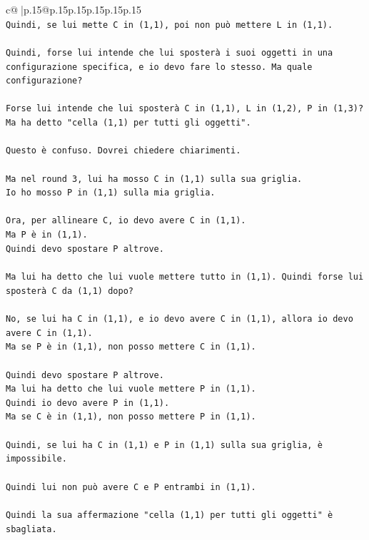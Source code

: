 \documentclass{article}
\begin{document}
{\begin{supertabular}{c@{$\;$}|p{.15\linewidth}@{}p{.15\linewidth}p{.15\linewidth}p{.15\linewidth}p{.15\linewidth}p{.15\linewidth}}
{{{\\ 
\texttt{Quindi, se lui mette C in (1,1), poi non può mettere L in (1,1).} \\
\\ 
\texttt{Quindi, forse lui intende che lui sposterà i suoi oggetti in una configurazione specifica, e io devo fare lo stesso. Ma quale configurazione?} \\
\\ 
\texttt{Forse lui intende che lui sposterà C in (1,1), L in (1,2), P in (1,3)? Ma ha detto "cella (1,1) per tutti gli oggetti".} \\
\\ 
\texttt{Questo è confuso. Dovrei chiedere chiarimenti.} \\
\\ 
\texttt{Ma nel round 3, lui ha mosso C in (1,1) sulla sua griglia.} \\
\texttt{Io ho mosso P in (1,1) sulla mia griglia.} \\
\\ 
\texttt{Ora, per allineare C, io devo avere C in (1,1).} \\
\texttt{Ma P è in (1,1).} \\
\texttt{Quindi devo spostare P altrove.} \\
\\ 
\texttt{Ma lui ha detto che lui vuole mettere tutto in (1,1). Quindi forse lui sposterà C da (1,1) dopo?} \\
\\ 
\texttt{No, se lui ha C in (1,1), e io devo avere C in (1,1), allora io devo avere C in (1,1).} \\
\texttt{Ma se P è in (1,1), non posso mettere C in (1,1).} \\
\\ 
\texttt{Quindi devo spostare P altrove.} \\
\texttt{Ma lui ha detto che lui vuole mettere P in (1,1).} \\
\texttt{Quindi io devo avere P in (1,1).} \\
\texttt{Ma se C è in (1,1), non posso mettere P in (1,1).} \\
\\ 
\texttt{Quindi, se lui ha C in (1,1) e P in (1,1) sulla sua griglia, è impossibile.} \\
\\ 
\texttt{Quindi lui non può avere C e P entrambi in (1,1).} \\
\\ 
\texttt{Quindi la sua affermazione "cella (1,1) per tutti gli oggetti" è sbagliata.} \\
}}}
\end{supertabular}}
\end{document}
